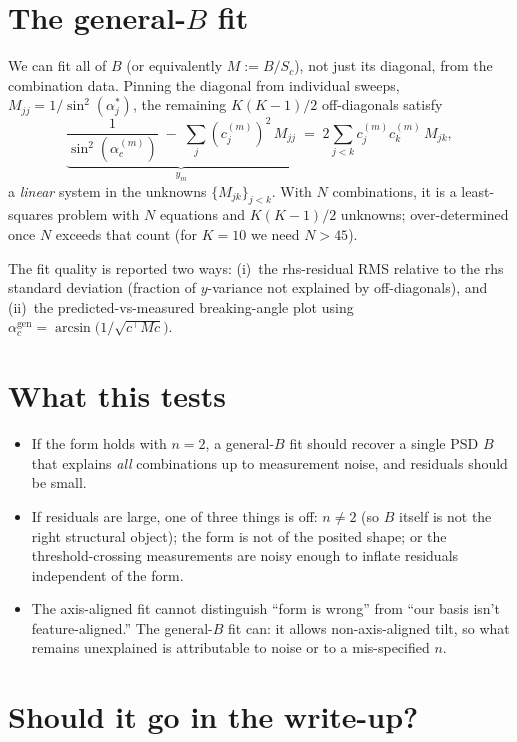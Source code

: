 \documentclass[11pt]{article}
\begin{document}
\section{The general-$B$ fit}

We can fit all of $B$ (or equivalently $M := B/S_c$), not just its diagonal, from the combination data. Pinning the diagonal from individual sweeps, $M_{jj} = 1/\sin^2(\alpha_j^*)$, the remaining $K(K{-}1)/2$ off-diagonals satisfy
\[
  \underbrace{\frac{1}{\sin^2(\alpha_c^{(m)})} \;-\; \sum_j (c_j^{(m)})^2\, M_{jj}}_{y_m}
  \;=\;
  2 \sum_{j<k} c_j^{(m)} c_k^{(m)} \, M_{jk},
\]
a \emph{linear} system in the unknowns $\{M_{jk}\}_{j<k}$. With $N$ combinations, it is a least-squares problem with $N$ equations and $K(K{-}1)/2$ unknowns; over-determined once $N$ exceeds that count (for $K=10$ we need $N > 45$).

The fit quality is reported two ways: (i)~the rhs-residual RMS relative to the rhs standard deviation (fraction of $y$-variance not explained by off-diagonals), and (ii)~the predicted-vs-measured breaking-angle plot using $\alpha_c^{\text{gen}} = \arcsin\bigl(1/\sqrt{c^\top M c}\bigr)$.

\section{What this tests}

\begin{itemize}
  \item If the form holds with $n=2$, a general-$B$ fit should recover a single PSD $B$ that explains \emph{all} combinations up to measurement noise, and residuals should be small.
  \item If residuals are large, one of three things is off: $n \ne 2$ (so $B$ itself is not the right structural object); the form is not of the posited shape; or the threshold-crossing measurements are noisy enough to inflate residuals independent of the form.
  \item The axis-aligned fit cannot distinguish ``form is wrong'' from ``our basis isn't feature-aligned.'' The general-$B$ fit can: it allows non-axis-aligned tilt, so what remains unexplained is attributable to noise or to a mis-specified $n$.
\end{itemize}

\section{Should it go in the write-up?}
\end{document}
